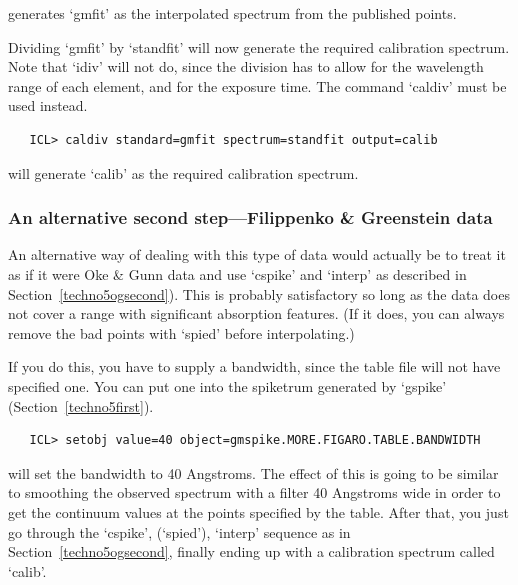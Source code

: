 \documentclass[11pt,twoside]{article}
\newcommand{\htmlref}[2]{#1}
\newcommand{\latorhtm}[2]{#1}
\newcommand{\latorhtm}[2]{#2}
\begin{document}
   generates `gmfit' as the interpolated spectrum from the published
   points.

   Dividing `gmfit' by `standfit' will now generate the required
   calibration spectrum.  Note that `idiv' will not do, since the
   division has to allow for the wavelength range of each element, and
   for the exposure time.  The command `caldiv' must be used instead.

\begin{verbatim}
   ICL> caldiv standard=gmfit spectrum=standfit output=calib
\end{verbatim}

   will generate `calib' as the required calibration spectrum.


\subsubsection{\label{techno5fgsecalt}An alternative second
   step\latorhtm{---}{-}Filippenko \& Greenstein data}

   An alternative way of dealing with this type of data would actually
   be to treat it as if it were Oke \& Gunn data and use `cspike' and
   `interp' as described in
   \latorhtm{Section~\ref{techno5ogsecond}).}
   {the section on \htmlref{the second step for Oke \& Gunn
   data).}{techno5ogsecond}}
   This is probably satisfactory so long as the data does not cover a
   range with significant absorption features.  (If it does, you can
   always remove the bad points with `spied' before interpolating.)

   If you do this, you have to supply a bandwidth, since the table file
   will not have specified one.  You can put one into the spiketrum
   generated by `gspike'
   \latorhtm{(Section~\ref{techno5first}).}
   {\htmlref{(section on first step).}{techno5first}}

\begin{verbatim}
   ICL> setobj value=40 object=gmspike.MORE.FIGARO.TABLE.BANDWIDTH
\end{verbatim}

   will set the bandwidth to 40 Angstroms.  The effect of this is going
   to be similar to smoothing the observed spectrum with a filter 40
   Angstroms wide in order to get the continuum values at the points
   specified by the table.  After that, you just go through the `cspike',
   (`spied'), `interp' sequence as in
   \latorhtm{Section~\ref{techno5ogsecond},}
   {the section on \htmlref{the second step for Oke \& Gunn
   data,}{techno5ogsecond}}
   finally ending up with a calibration spectrum called `calib'.
\end{document}
